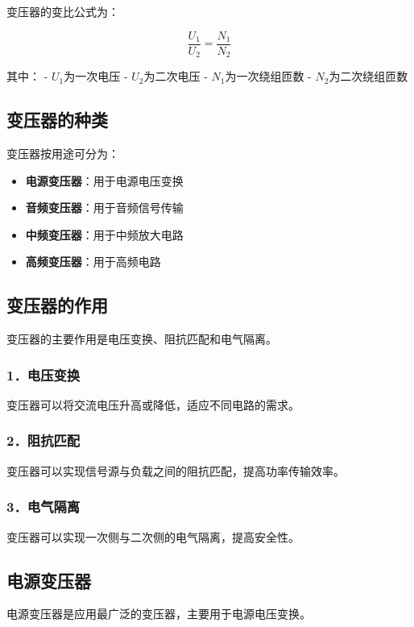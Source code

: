 \documentclass[12pt,UTF8]{ctexbook}
\begin{document}
变压器的变比公式为：

\[ \frac{U_1}{U_2} = \frac{N_1}{N_2} \]

其中：
- $U_1$为一次电压
- $U_2$为二次电压
- $N_1$为一次绕组匝数
- $N_2$为二次绕组匝数

\subsection{变压器的种类}

变压器按用途可分为：

\begin{itemize}[leftmargin=2cm]
	\item \textbf{电源变压器}：用于电源电压变换
	\item \textbf{音频变压器}：用于音频信号传输
	\item \textbf{中频变压器}：用于中频放大电路
	\item \textbf{高频变压器}：用于高频电路
\end{itemize}

\subsection{变压器的作用}

变压器的主要作用是电压变换、阻抗匹配和电气隔离。

\subsubsection{1．电压变换}

变压器可以将交流电压升高或降低，适应不同电路的需求。

\subsubsection{2．阻抗匹配}

变压器可以实现信号源与负载之间的阻抗匹配，提高功率传输效率。

\subsubsection{3．电气隔离}

变压器可以实现一次侧与二次侧的电气隔离，提高安全性。

\subsection{电源变压器}

电源变压器是应用最广泛的变压器，主要用于电源电压变换。
\end{document}
